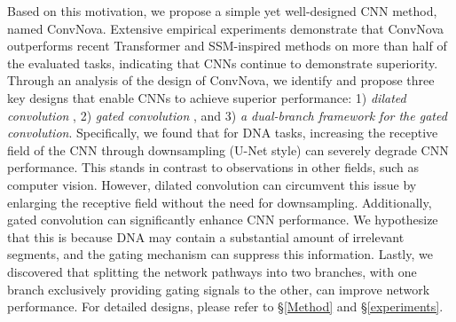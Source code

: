 Based on this motivation, we propose a simple yet well-designed CNN method, named ConvNova. Extensive empirical experiments demonstrate that ConvNova outperforms recent Transformer %
and 
SSM-inspired methods on more than half of the evaluated tasks, indicating that CNNs continue to demonstrate superiority. Through an analysis of the design of ConvNova, we identify and propose three key designs that enable CNNs to achieve superior performance:
1) \textit{dilated convolution } \citep{yu2015multi}, 2) \textit{gated convolution} \citep{yu2019free}, and 3) \textit{a dual-branch framework for the gated convolution}. Specifically, we found that for DNA tasks, increasing the receptive field of the CNN through downsampling (U-Net \citep{ronneberger2015u} style) 
can severely degrade CNN performance.
%
This stands in contrast to observations in other fields, such as computer vision.
%
However, dilated convolution can circumvent this issue by enlarging the receptive field without the need for downsampling. Additionally, gated convolution can significantly enhance CNN performance. We hypothesize that this is because DNA may contain a substantial amount of irrelevant segments, and the gating mechanism can suppress this information. Lastly, we discovered that splitting the network pathways into two branches, with one branch exclusively providing gating signals to the other, can improve network performance. For detailed designs, please refer to 
\S \ref{Method} and %
\S \ref{experiments}.



